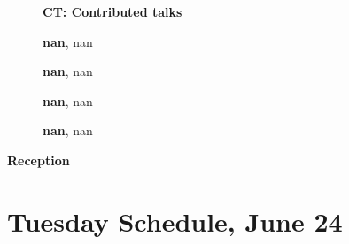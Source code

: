 \documentclass[ILAS2025-program.tex]{subfiles}
\begin{document}
\begin{description}
    \begin{description}
    \item[] {\color{mstitle}\textbf{CT: Contributed talks}} 
    \item[] \textbf{nan}, nan
        \item[] \textbf{nan}, nan
        \item[] \textbf{nan}, nan
        \item[] \textbf{nan}, nan
        \end{description}
    \item[\info{18:00\textrm{--}20:00}] \textbf{Reception} 
    \end{description}
    \newpage

\section{Tuesday Schedule, June 24}
    
\end{document}

